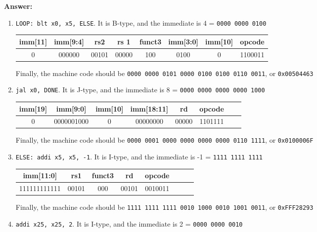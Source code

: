 \documentclass[11pt,a4paper]{article}
\begin{document}
\textbf{Answer:}

\begin{enumerate}[1)]
    \item \verb|LOOP: blt x0, x5, ELSE|. It is B-type, and the immediate is 4 =  \verb|0000 0000 0100|
    
        \begin{center}
\begin{tabular}{|c|c|c|c|c|c|c|c|}
\hline imm[11] & imm[9:4] & rs2 & rs 1 & funct3 & imm[3:0] & imm[10] & opcode \\
\hline 0 & 000000 & 00101 & 00000 & 100 & 0100 & 0 & 1100011 \\
\hline
\end{tabular}
\end{center}

Finally, the machine code should be \verb|0000 0000 0101 0000 0100 0100 0110 0011|, or  \verb|0x00504463|

    \item \verb|jal x0, DONE|. It is J-type, and the immediate is 8 =  \verb|0000 0000 0000 0000 1000|
    
\begin{center}
\begin{tabular}{|c|c|c|c|c|c|c|c|}
\hline imm[19] & imm[9:0] & imm[10] & imm[18:11] & rd & opcode \\
\hline 0 & 0000001000 & 0 & 00000000 & 00000 & 1101111 \\
\hline
\end{tabular}
\end{center}

Finally, the machine code should be \verb|0000 0001 0000 0000 0000 0000 0110 1111|, or  \verb|0x0100006F|

\item \verb|ELSE: addi x5, x5, -1|. It is I-type, and the immediate is -1 =  \verb|1111 1111 1111|
    
\begin{center}
\begin{tabular}{|c|c|c|c|c|c|c|c|}
\hline imm[11:0] & rs1 & funct3 & rd & opcode \\
\hline 111111111111 & 00101 & 000 & 00101 & 0010011 \\
\hline
\end{tabular}
\end{center}

Finally, the machine code should be \verb|1111 1111 1111 0010 1000 0010 1001 0011|, or  \verb|0xFFF28293|

\item \verb|addi x25, x25, 2|. It is I-type, and the immediate is 2 =  \verb|0000 0000 0010|
    

\end{enumerate}
\end{document}
